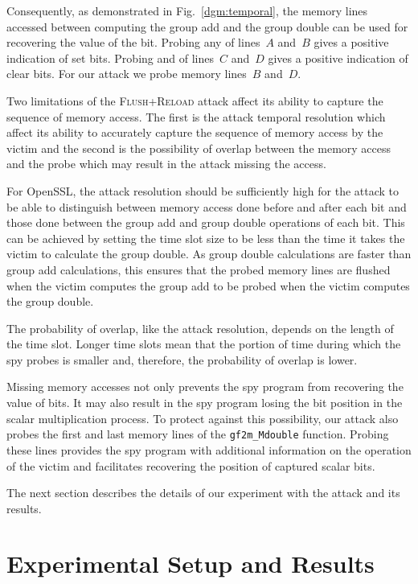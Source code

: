 \documentclass{llncs}
\begin{document}
Consequently, as demonstrated in Fig.~\ref{dgm:temporal}, the memory lines accessed between computing
the group add and the group double can be used for recovering the value of the bit.
Probing any of lines~$A$ and~$B$ gives a positive indication of set bits.  
Probing and of lines~$C$ and~$D$ gives a positive indication of clear bits.
For our attack we probe memory lines~$B$ and~$D$.

Two limitations of the \textsc{Flush+Reload} attack affect its ability to capture the sequence of memory access.
The first is the attack temporal resolution which affect its ability to accurately capture the sequence of memory access
by the victim and the second is the possibility of overlap between the memory access and the probe which may result
in the attack missing the access.

For OpenSSL, the attack resolution should be sufficiently high for the attack to be able to distinguish between 
memory access done before and after each bit and those done between the group add and group double operations of each bit.
This can be achieved by setting the time slot size to be less than the time it takes the victim to calculate the group double.
As group double calculations are faster than group add calculations, this ensures that the probed memory lines are flushed
when the victim computes the group add to be probed when the victim computes the group double.

The probability of overlap, like the attack resolution, depends on the length of the time slot.
Longer time slots mean that the portion of time during which the spy probes is smaller and, therefore, 
the probability of overlap is lower.

Missing memory accesses not only prevents the spy program from recovering the value of bits.
It may also result in the spy program losing the bit position in the scalar multiplication process.
To protect against this possibility, our attack also probes the first and last memory lines of the 
\texttt{gf2m\_Mdouble} function.
Probing these lines provides the spy program with additional information on the operation of the victim
and facilitates recovering the position of captured scalar bits.



The next section describes the details of our experiment with the attack and its results.


\section{Experimental Setup and Results}\label{sec:results}
\end{document}

